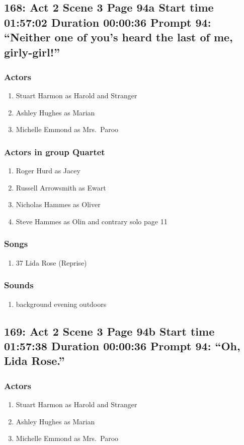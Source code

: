 \subsection{168: Act 2 Scene 3 Page 94a Start time 01:57:02 Duration 00:00:36 Prompt 94: ``Neither one of you's heard the last of me, girly-girl!''}

\subsubsection{Actors}
\begin{enumerate}
\item Stuart Harmon as Harold and Stranger
\item Ashley Hughes as Marian
\item Michelle Emmond as Mrs.~Paroo
\end{enumerate}
\subsubsection{Actors in group Quartet}
\begin{enumerate}
\item Roger Hurd as Jacey
\item Russell Arrowsmith as Ewart
\item Nicholas Hammes as Oliver
\item Steve Hammes as Olin and contrary solo page 11
\end{enumerate}

\subsubsection{Songs}
\begin{enumerate}
\item 37 Lida Rose (Reprise)
\end{enumerate}\subsubsection{Sounds}
\begin{enumerate}
\item background evening outdoors
\end{enumerate}
\subsection{169: Act 2 Scene 3 Page 94b Start time 01:57:38 Duration 00:00:36 Prompt 94: ``Oh, Lida Rose.''}

\subsubsection{Actors}
\begin{enumerate}
\item Stuart Harmon as Harold and Stranger
\item Ashley Hughes as Marian
\item Michelle Emmond as Mrs.~Paroo
\end{enumerate}

